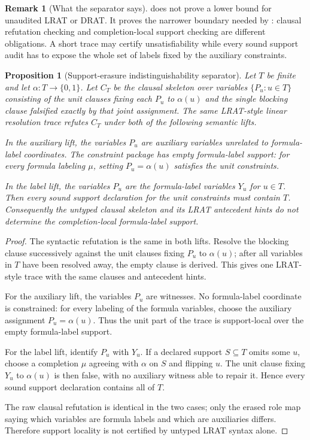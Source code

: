 \documentclass[11pt]{article}
\newtheorem{proposition}[theorem]{Proposition}
\theoremstyle{definition}
\newtheorem{remark}[theorem]{Remark}
\newcommand{\bits}{\{0,1\}}
\begin{document}
\begin{remark}[What the separator says]\label{rem:support-audit-necessity-scope}
 does not prove a lower bound for unaudited LRAT or DRAT.  It proves the narrower boundary needed by : clausal refutation checking and completion-local support checking are different obligations.  A short trace may certify unsatisfiability while every sound support audit has to expose the whole set of labels fixed by the auxiliary constraints.
\end{remark}

\begin{proposition}[Support-erasure indistinguishability separator]\label{prop:support-erasure-indistinguishability}
Let \(T\) be finite and let \(\alpha:T\to\bits\).  Let \(C_T\) be the clausal skeleton over variables \(\{P_u:u\in T\}\) consisting of the unit clauses fixing each \(P_u\) to \(\alpha(u)\) and the single blocking clause falsified exactly by that joint assignment.  The same LRAT-style linear resolution trace refutes \(C_T\) under both of the following semantic lifts.

In the auxiliary lift, the variables \(P_u\) are auxiliary variables unrelated to formula-label coordinates.  The constraint package has empty formula-label support: for every formula labeling \(\mu\), setting \(P_u=\alpha(u)\) satisfies the unit constraints.

In the label lift, the variables \(P_u\) are the formula-label variables \(Y_u\) for \(u\in T\).  Then every sound support declaration for the unit constraints must contain \(T\).  Consequently the untyped clausal skeleton and its LRAT antecedent hints do not determine the completion-local formula-label support.
\end{proposition}

\begin{proof}
The syntactic refutation is the same in both lifts.  Resolve the blocking clause successively against the unit clauses fixing \(P_u\) to \(\alpha(u)\); after all variables in \(T\) have been resolved away, the empty clause is derived.  This gives one LRAT-style trace with the same clauses and antecedent hints.

For the auxiliary lift, the variables \(P_u\) are witnesses.  No formula-label coordinate is constrained: for every labeling of the formula variables, choose the auxiliary assignment \(P_u=\alpha(u)\).  Thus the unit part of the trace is support-local over the empty formula-label support.

For the label lift, identify \(P_u\) with \(Y_u\).  If a declared support \(S\subseteq T\) omits some \(u\), choose a completion \(\mu\) agreeing with \(\alpha\) on \(S\) and flipping \(u\).  The unit clause fixing \(Y_u\) to \(\alpha(u)\) is then false, with no auxiliary witness able to repair it.  Hence every sound support declaration contains all of \(T\).

The raw clausal refutation is identical in the two cases; only the erased role map saying which variables are formula labels and which are auxiliaries differs.  Therefore support locality is not certified by untyped LRAT syntax alone.
\end{proof}
\end{document}
